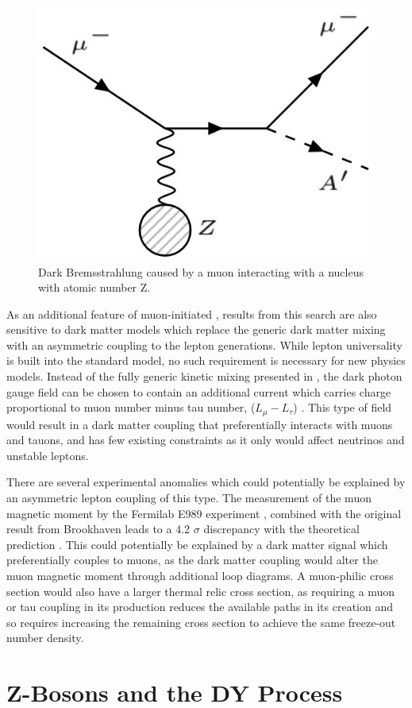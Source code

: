 \begin{figure}[ht]
	\centering
	\includegraphics[width=\textwidth]{figures/dbrem_feyn_diagram.jpg}
        \caption[Dark Bremmstrahlung Feynman Diagram]{Dark Bremsstrahlung caused by a muon interacting with a nucleus with atomic number Z.}
\end{figure}

As an additional feature of muon-initiated \dbrem, results from this search are also sensitive to dark matter models which replace the generic dark matter mixing with an asymmetric coupling to the lepton generations.
While lepton universality is built into the standard model, no such requirement is necessary for new physics models. 
Instead of the fully generic kinetic mixing presented in , the dark photon gauge field can be chosen to contain an additional current which carries charge proportional to muon number minus tau number, ($L_\mu - L_\tau$) \cite{neut_trident}.
This type of field would result in a dark matter coupling that preferentially interacts with muons and tauons, and has few existing constraints as it only would affect neutrinos and unstable leptons.

There are several experimental anomalies which could potentially be explained by an asymmetric lepton coupling of this type.
The measurement of the muon magnetic moment by the Fermilab E989 experiment \cite{gminus2}, combined with the original result from Brookhaven \cite{gminus2_bnl} leads to a 4.2 $\sigma$ discrepancy with the theoretical prediction \cite{gminus2_theory}. 
This could potentially be explained by a dark matter signal which preferentially couples to muons, as the dark matter coupling would alter the muon magnetic moment through additional loop diagrams.
A muon-philic cross section would also have a larger thermal relic cross section, as requiring a muon or tau coupling in its production reduces the available paths in its creation and so requires increasing the remaining cross section to achieve the same freeze-out number density.

\section{Z-Bosons and the DY Process}


